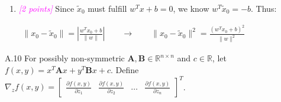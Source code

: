\documentclass{article}
\newcommand{\field}[1]{\mathbb{#1}}
\newcommand{\1}{\mathbf{1}}
\newcommand{\R}{\field{R}} %
\newcommand{\mat}[1]{\boldsymbol{#1}} %
\newcommand{\points}[1]{\small\textcolor{magenta}{\emph{[#1 points]}} \normalsize}
\begin{document}
\begin{enumerate}
\begin{center}
	\end{center}
	\item \points{2} Since $\widetilde{x}_0$ must fulfill $w^Tx +b = 0$, we know $w^T\widetilde{x}_0=-b$. Thus:
	\begin{center}
		$\begin{aligned}\| x_0 - \widetilde{x}_0 \| = \left | \frac{w^Tx_0 +b}{\|w\|} \right | \qquad \rightarrow \qquad \| x_0 - \widetilde{x}_0 \|^2 =  \frac{(w^Tx_0 +b)^2}{\|w\|^2} \end{aligned} $
	\end{center}
	
\end{enumerate} 

A.10 For possibly non-symmetric $\mat{A}, \mat{B} \in \R^{n \times n}$ and $c \in \R$, let $f(x, y) = x^T \mat{A} x + y^T \mat{B} x + c$. Define $\nabla_z f(x,y) = \begin{bmatrix} \frac{\partial f(x,y)}{\partial z_1} & \frac{\partial f(x,y)}{\partial z_2} & \dots & \frac{\partial f(x,y)}{\partial z_n} \end{bmatrix}^T$.  
\end{document}
